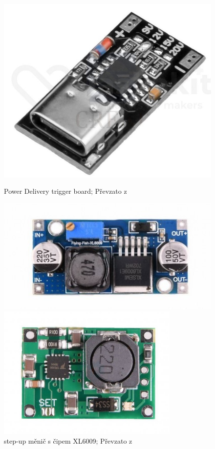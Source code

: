 \begin{figure}[htb]
  \centering
  \begin{minipage}{0.3\textwidth}
    \centering
  \includegraphics[width=1\textwidth]{img/PDtrig.jpg}
  \caption{\label{fig:PDtrig} Power Delivery trigger board; Převzato z~\cite{laskakit-PD}}
  \end{minipage}\hfill
  \begin{minipage}{0.3\textwidth}
    \centering
  \includegraphics[width=1\textwidth]{img/XL6009.jpg}
  \caption{\label{fig:XL6009} step-up měnič s čipem XL6009; Převzato z~\cite{laskakit-XL6009}}
  \end{minipage}
  \begin{minipage}{0.3\textwidth}
    \centering
    \includegraphics[width=0.8\textwidth]{img/TP5100.jpg}

\end{minipage}
\end{figure}
